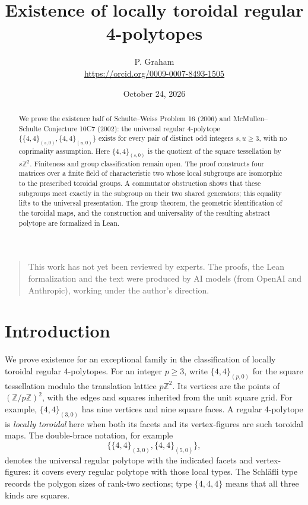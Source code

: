 \documentclass[11pt]{article}
\title{Existence of locally toroidal regular 4-polytopes}
\author{P. Graham\\ \small\url{https://orcid.org/0009-0007-8493-1505}}
\date{October 24, 2026}
\theoremstyle{definition}
\newcommand{\Z}{\mathbb Z}
\newcommand{\tor}[1]{\{4,4\}_{(#1,0)}}
\begin{document}
\maketitle
\begin{abstract}
We prove the existence half of Schulte--Weiss Problem 16 (2006) and
McMullen--Schulte Conjecture 10C7 (2002): the universal regular
4-polytope $\{\tor{s},\tor{u}\}$ exists for every pair of distinct odd
integers $s,u\geq3$, with no coprimality assumption. Here $\tor{s}$ is the
quotient of the square tessellation by $s\Z^2$. Finiteness and group
classification remain open. The proof constructs four matrices over a
finite field of characteristic two whose local subgroups are isomorphic
to the prescribed toroidal groups. A commutator obstruction shows that
these subgroups meet exactly in the subgroup on their two shared
generators; this equality lifts to the universal presentation. The group
theorem, the geometric identification of the toroidal maps, and the
construction and universality of the resulting abstract polytope are
formalized in Lean.
\end{abstract}

\begin{quotation}\small\noindent
This work has not yet been reviewed by experts.
The proofs, the Lean formalization and the text were produced by AI models (from OpenAI and Anthropic), working under the author's direction.
\end{quotation}

\section{Introduction}
We prove existence for an exceptional family in the classification of
locally toroidal regular 4-polytopes. For an integer $p\geq3$, write
$\tor{p}$ for the square tessellation modulo the translation lattice
$p\Z^2$. Its vertices are the points of $(\Z/p\Z)^2$, with the edges and
squares inherited from the unit square grid. For example, $\tor{3}$ has
nine vertices and nine square faces. A regular 4-polytope is
\emph{locally toroidal} here when both its facets and its vertex-figures
are such toroidal maps. The double-brace notation, for example
\[
                         \{\tor{3},\tor{5}\},
\]
denotes the universal regular polytope with the indicated facets and
vertex-figures: it covers every regular polytope with those local types.
The Schläfli type records the polygon sizes of rank-two sections;
type $\{4,4,4\}$ means that all three kinds are squares.
\end{document}
